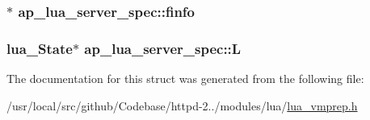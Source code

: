 \subsubsection[{\texorpdfstring{finfo}{finfo}}]{$\ast$ ap\+\_\+lua\+\_\+server\+\_\+spec\+::finfo}\hypertarget{structap__lua__server__spec_a119c899d97887709311ec325875662ca}{}\label{structap__lua__server__spec_a119c899d97887709311ec325875662ca}
\subsubsection[{\texorpdfstring{L}{L}}]{\setlength{\rightskip}{0pt plus 5cm}lua\+\_\+\+State$\ast$ ap\+\_\+lua\+\_\+server\+\_\+spec\+::L}\hypertarget{structap__lua__server__spec_aa154aeca7d8846f6093639b6e94075e6}{}\label{structap__lua__server__spec_aa154aeca7d8846f6093639b6e94075e6}


The documentation for this struct was generated from the following file\+:\begin{DoxyCompactItemize}
\item 
/usr/local/src/github/\+Codebase/httpd-\/2../modules/lua/\hyperlink{lua__vmprep_8h}{lua\+\_\+vmprep.\+h}\end{DoxyCompactItemize}
